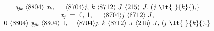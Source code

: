 \documentclass[crop,varwidth]{standalone}
\begin{document}
\begin{equation*}
{{\begin{matrix}
{{{\miitalic{y}}}\sb{{\miitalic{jk}}}}{\hspace{0.33em}}\unicode{8804}{\hspace{0.33em}}{{{\miitalic{x}}}\sb{{\miitalic{k}}}}{\minormal{,}}{\hspace{0.33em}}{\hspace{0.33em}}{\hspace{0.33em}}{\hspace{0.33em}}{\hspace{0.33em}}\unicode{8704}{\minormal{{}}{\miitalic{j}}{\minormal{,}}{\hspace{0.33em}}{\miitalic{k}}{\minormal{}}}{\hspace{0.33em}}\unicode{8712}{\hspace{0.33em}}{\miitalic{J}}{\hspace{0.33em}}\unicode{215}{\hspace{0.33em}}{\miitalic{J}}{\minormal{,}}{\hspace{0.33em}}{\minormal{(}}{\miitalic{j}}{\hspace{0.33em}}\lt {\hspace{0.33em}}{\miitalic{k}}{\minormal{),}}\\
{{{\miitalic{x}}}\sb{{\miitalic{j}}}}{\hspace{0.33em}}={\hspace{0.33em}}{\minormal{{}}{0}{\minormal{,}}{\hspace{0.33em}}{1}{\minormal{},}}{\hspace{0.33em}}{\hspace{0.33em}}{\hspace{0.33em}}{\hspace{0.33em}}{\hspace{0.33em}}\unicode{8704}{\miitalic{j}}{\hspace{0.33em}}\unicode{8712}{\hspace{0.33em}}{\miitalic{J}}{\minormal{,}}\\
{0}{\hspace{0.33em}}\unicode{8804}{\hspace{0.33em}}{{{\miitalic{y}}}\sb{{\miitalic{jk}}}}{\hspace{0.33em}}\unicode{8804}{\hspace{0.33em}}{1}{\minormal{,}}{\hspace{0.33em}}{\hspace{0.33em}}{\hspace{0.33em}}{\hspace{0.33em}}\unicode{8704}{\minormal{{}}{\miitalic{j}}{\minormal{,}}{\hspace{0.33em}}{\miitalic{k}}{\minormal{}}}{\hspace{0.33em}}\unicode{8712}{\hspace{0.33em}}{\miitalic{J}}{\hspace{0.33em}}\unicode{215}{\hspace{0.33em}}{\miitalic{J}}{\minormal{,}}{\hspace{0.33em}}{\minormal{(}}{\miitalic{j}}{\hspace{0.33em}}\lt {\hspace{0.33em}}{\miitalic{k}}{\minormal{).}}
\end{matrix}}}
\end{equation*}
\end{document}

